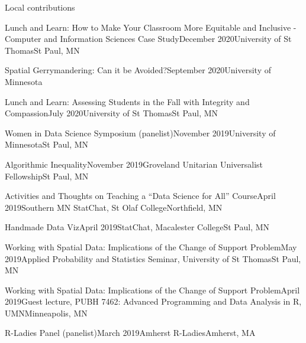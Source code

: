 \documentclass{resume} %
\begin{document}
\begin{rSection}{Local contributions}
\begin{sSubsection}{Lunch and Learn: How to Make Your Classroom More Equitable and Inclusive - Computer and Information Sciences Case Study}{}{December 2020}{University of St Thomas}{St Paul, MN}
\end{sSubsection}

\begin{sSubsection}{Spatial Gerrymandering: Can it be Avoided?}{}{September 2020}{University of Minnesota}{}
\end{sSubsection}

\begin{sSubsection}{Lunch and Learn: Assessing Students in the Fall with Integrity and Compassion}{}{July 2020}{University of St Thomas}{St Paul, MN}
\end{sSubsection}

\begin{sSubsection}{Women in Data Science Symposium}{ (panelist)}{November 2019}{University of Minnesota}{St Paul, MN}
\end{sSubsection}

\begin{sSubsection}{Algorithmic Inequality}{}{November 2019}{Groveland Unitarian Universalist Fellowship}{St Paul, MN}
\end{sSubsection}

\begin{sSubsection}{Activities and Thoughts on Teaching a ``Data Science for All'' Course}{}{April 2019}{Southern MN StatChat, St Olaf College}{Northfield, MN}
\end{sSubsection}

\begin{sSubsection}{Handmade Data Viz}{}{April 2019}{StatChat, Macalester College}{St Paul, MN}
\end{sSubsection}

\begin{sSubsection}{Working with Spatial Data: Implications of the Change of Support Problem}{}{May 2019}{Applied Probability and Statistics Seminar, University of St Thomas}{St Paul, MN}
\end{sSubsection}

\begin{sSubsection}{Working with Spatial Data: Implications of the Change of Support Problem}{}{April 2019}{Guest lecture, PUBH 7462: Advanced Programming and Data Analysis in R, UMN}{Minneapolis, MN}
\end{sSubsection}

\begin{sSubsection}{R-Ladies Panel}{ (panelist)}{March 2019}{Amherst R-Ladies}{Amherst, MA}
\end{sSubsection}


\end{rSection}
\end{document}
